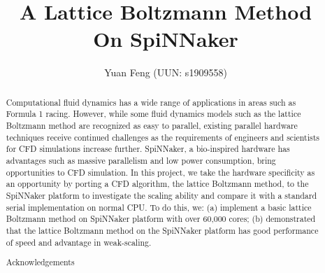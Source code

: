 \documentclass[12pt, twoside]{article}
\title{A Lattice Boltzmann Method \\ On SpiNNaker }
\author{Yuan Feng (UUN: s1909558)}
\begin{document}


\newpage
\begin{abstract}


Computational fluid dynamics has a wide range of applications in areas such as Formula 1 racing. However, while some fluid dynamics models such as the lattice Boltzmann method are recognized as easy to parallel, existing parallel hardware techniques receive continued challenges as the requirements of engineers and scientists for CFD simulations increase further. SpiNNaker, a bio-inspired hardware has advantages such as massive parallelism and low power consumption, bring opportunities to CFD simulation. In this project, we take the hardware specificity as an opportunity by porting a CFD algorithm, the lattice Boltzmann method, to the SpiNNaker platform to investigate the scaling ability and compare it with a standard serial implementation on normal CPU. To do this, we: (a) implement a basic lattice Boltzmann method on SpiNNaker platform with over 60,000 cores; (b) demonstrated that the lattice Boltzmann method on the SpiNNaker platform has good performance of speed and advantage in weak-scaling.

\end{abstract}



\newpage
\renewcommand{\abstractname}{Acknowledgements}
\begin{abstract}

Acknowledgements

\end{abstract}

\newpage
\tableofcontents

\newpage

\newpage

\newpage

\newpage

\newpage

\newpage


\newpage
%
%


\end{document}
